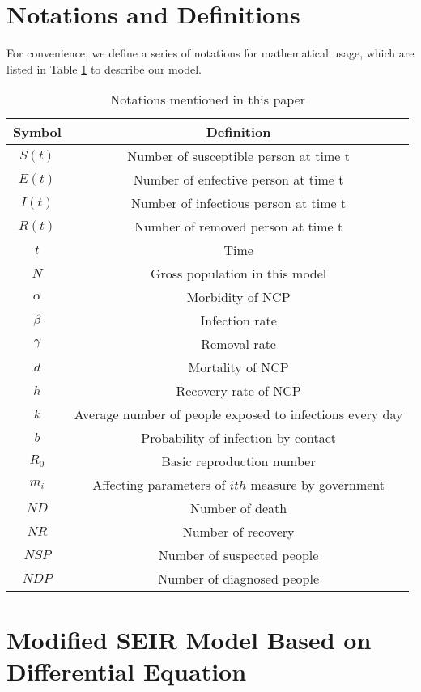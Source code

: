 \documentclass{mcmthesis}
\begin{document}
\section{Notations and Definitions}\label{S3}
    For convenience, we define a series of notations for mathematical usage, which are listed in Table \ref{notation} to describe our model.
\begin{table}[h]\large
    \centering
    \caption{Notations mentioned in this paper}
    \label{notation}
    \begin{tabular}{c c}
\toprule[2pt]
        Symbol & Definition\\
\hline
    $S(t)$ & Number of susceptible person at time t\\
    $E(t)$ & Number of enfective person at time t\\
    $I(t)$ & Number of infectious person at time t\\
    $R(t)$ & Number of removed person at time t\\
    $t$ & Time\\
    $N$ & Gross population in this model\\
    $\alpha$ & Morbidity of NCP\\
    $\beta$ & Infection rate\\
    $\gamma$ & Removal rate\\
    $d$ & Mortality of NCP\\
    $h$ & Recovery rate of NCP\\
    $k$ & Average number of people exposed to infections every day \\
    $b$ & Probability of infection by contact\\
    $R_0$ & Basic reproduction number\\
    $m_i$ & Affecting parameters of $ith$ measure by government \\
    $ND$ & Number of death\\
    $NR$ & Number of recovery\\
    $NSP$ & Number of suspected people\\
    $NDP$ & Number of diagnosed people\\
\bottomrule[2pt]
    \end{tabular}
\end{table}



\section{Modified SEIR Model Based on Differential Equation} \label{S4}
	
\end{document}
